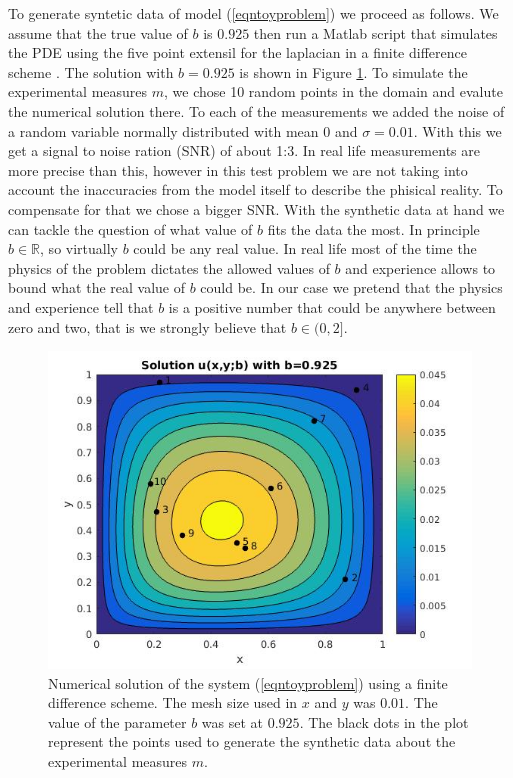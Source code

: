 \documentclass[12pt]{book}
\begin{document}
To generate syntetic data of model (\ref{eqntoyproblem}) we proceed as follows. We assume that the true value 
of $b$ is $0.925$ then run a Matlab script that simulates the PDE using the five point extensil for the laplacian
in a finite difference scheme \cite{thomas2013numerical}. The solution with $b=0.925$ is shown in Figure 
\ref{figsolU}.  To simulate the experimental measures $m$, we chose 10 random points in the domain
and evalute the numerical solution there. To each of the measurements we added the noise of a
random variable normally distributed with mean $0$ and $\sigma=0.01$. With this we get a signal 
to noise ration (SNR) of about 1:3. In real life measurements are more precise than this, however
in this test problem we are not taking into account the inaccuracies from the model itself to describe
the phisical reality. To compensate for that we chose a bigger SNR. 
\newline
With the synthetic data at hand we can tackle the question of what value of $b$ fits the data the most.
In principle $b\in\mathbb{R}$, so virtually $b$ could be any real value. In real life most of the time
the physics of the problem dictates the allowed values of $b$ and experience allows to bound
what the real value of $b$ could be. In our case we pretend that the physics
and experience tell that   $b$ is a positive number that  could be  anywhere between
zero and two, that is we strongly believe that $b\in (0,2]$.


\begin{figure}[H]
\centering
\includegraphics[scale=0.5]{./FigChap3/solu}
\caption{Numerical solution of the system (\ref{eqntoyproblem}) using a finite difference scheme. The mesh
size used in $x$ and $y$ was $0.01$. The value of the parameter $b$ was set at $0.925$. The black dots
in the plot represent the points used to generate the synthetic data about the experimental
measures $m$.}
\label{figsolU}
\end{figure}
\end{document}
